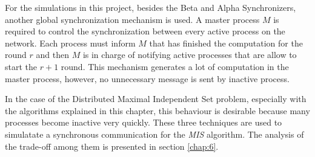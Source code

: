 For the simulations in this project, besides the Beta and Alpha Synchronizers, another global synchronization mechanism is used. A master process $M$ is required to control the synchronization between every active process on the network.  Each process must inform $M$ that has finished the computation for the round $r$ and then $M$ is in charge of notifying active processes that are allow to start the $r + 1$ round. This mechanism generates a lot of computation in the master process, however, no unnecessary message is sent by inactive process. 

In the case of the Distributed Maximal Independent Set problem, especially with the algorithms explained in this chapter, this behaviour is desirable because many processes become inactive very quickly. These three techniques are used to simulatate a synchronous communication for the \textit{MIS} algorithm. The analysis of the trade-off among them is presented in section \ref{chap:6}.

\newpage



